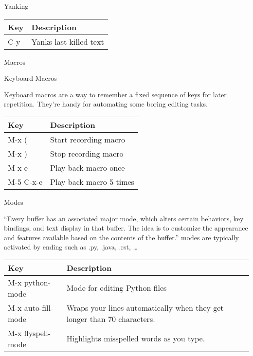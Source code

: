 Yanking

\begin{longtable}[]{ll}
\toprule
Key & Description\tabularnewline
\midrule
\endhead
C-y & Yanks last killed text\tabularnewline
\bottomrule
\end{longtable}

Macros

Keyboard Macros

Keyboard macros are a way to remember a fixed sequence of keys for later
repetition. They're handy for automating some boring editing tasks.

\begin{longtable}[]{ll}
\toprule
Key & Description\tabularnewline
\midrule
\endhead
M-x ( & Start recording macro\tabularnewline
M-x ) & Stop recording macro\tabularnewline
M-x e & Play back macro once\tabularnewline
M-5 C-x-e & Play back macro 5 times\tabularnewline
\bottomrule
\end{longtable}

Modes

``Every buffer has an associated major mode, which alters certain
behaviors, key bindings, and text display in that buffer. The idea is to
customize the appearance and features available based on the contents of
the buffer.'' modes are typically activated by ending such as .py,
.java, .rst, \ldots{}

\begin{longtable}[]{ll}
\toprule
Key & Description\tabularnewline
\midrule
\endhead
M-x python-mode & Mode for editing Python files\tabularnewline
M-x auto-fill-mode & Wraps your lines automatically when they get longer
than 70 characters.\tabularnewline
M-x flyspell-mode & Highlights misspelled words as you
type.\tabularnewline
\bottomrule
\end{longtable}
